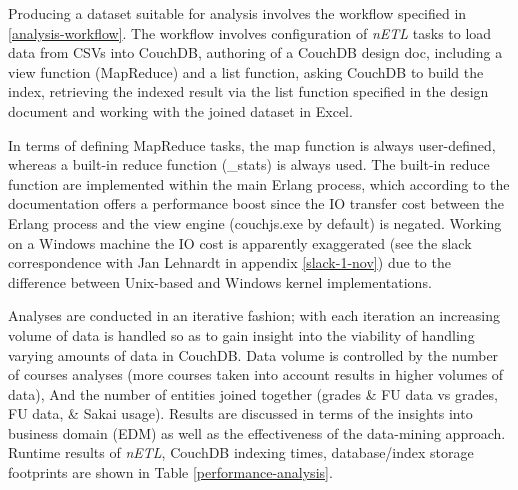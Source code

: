 Producing a dataset suitable for analysis involves the workflow specified in \ref{analysis-workflow}. The workflow involves configuration of \textit{nETL} tasks to load data from CSVs into CouchDB, authoring of a CouchDB design doc, including a view function (MapReduce) and a list function, asking CouchDB to build the index, retrieving the indexed result via the list function specified in the design document and working with the joined dataset in Excel.

In terms of defining MapReduce tasks, the map function is always user-defined, whereas a built-in reduce function (\_stats) is always used. The built-in reduce function are implemented within the main Erlang process, which according to the documentation offers a performance boost since the IO transfer cost between the Erlang process and the view engine (couchjs.exe by default) is negated. Working on a Windows machine the IO cost is apparently exaggerated (see the slack correspondence with Jan Lehnardt in appendix \ref{slack-1-nov}) due to the difference between Unix-based and Windows kernel implementations.

Analyses are conducted in an iterative fashion; with each iteration an increasing volume of data is handled so as to gain insight into the viability of handling varying amounts of data in CouchDB. Data volume is controlled by the number of courses analyses (more courses taken into account results in higher volumes of data), And the number of entities joined together (grades \& FU data vs grades, FU data, \& Sakai usage). Results are discussed in terms of the insights into business domain (EDM) as well as the effectiveness of the data-mining approach. Runtime results of \textit{nETL}, CouchDB indexing times, database/index storage footprints are shown in Table \ref{performance-analysis}.

